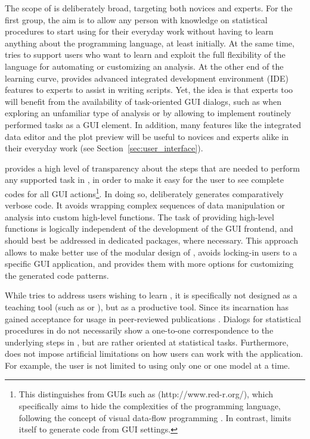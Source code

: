 The scope of  is deliberately broad, targeting both  novices and experts.
For the first group, the aim is to allow any person with knowledge on
statistical procedures to start using  for their everyday work 
without having to learn anything about the  programming language,
at least initially. At the same time,  tries to support users who want to learn and
exploit the full flexibility of the  language for automating or customizing
an analysis. At the other end of the learning curve,  provides advanced integrated development environment (IDE)
features to  experts to assist in writing  scripts. Yet, the idea
is that  experts too will benefit from the availability of task-oriented GUI
dialogs, such as when exploring an unfamiliar type of analysis
or by allowing to implement routinely performed tasks as a GUI element. In
addition, many features like the integrated data editor and the plot preview 
will be useful to  novices and  experts alike in their everyday work
(see Section~\ref{sec:user_interface}).

 provides a high level of transparency about the steps that are needed to
perform any supported task in , in order to make it easy for the user to see
complete codes for all GUI actions\footnote{
  This distinguishes  from  GUIs such as  (http://www.red-r.org/), which 
  specifically aims to hide the complexities of the  programming language, following the concept of visual data-flow 
  programming \citep{Sutherland1966}. In contrast,  limits itself to generate  code from GUI settings.
}. In doing so,  deliberately generates
comparatively verbose code. It avoids wrapping complex sequences of data
manipulation or analysis into custom high-level  functions. The task of
providing high-level functions is logically independent of the development of the
GUI frontend, and should best be addressed in dedicated  packages, where necessary.
This approach allows to make better use of the modular design of , avoids
locking-in users to a specific GUI application, and provides them with more options for
customizing the generated code patterns.

While  tries to address users wishing to learn , it is specifically not
designed as a teaching tool (such as  \cite{Fox2005} or  \cite{TeachingDemos2010}), but as
a productive tool. Since its incarnation  has gained acceptance for usage in peer-reviewed 
publications \citep{Zou2008, Zou2009, Rugg-Gunn2010, Yang2011, Roediger2011, Roediger_VS}.
Dialogs for statistical procedures in  do not
necessarily show a one-to-one correspondence to the underlying steps in , but are
rather oriented at statistical tasks. Furthermore,  does not impose
artificial limitations on how users can work with the application. For example,
the user is not limited to using only one  or one model at a
time.

